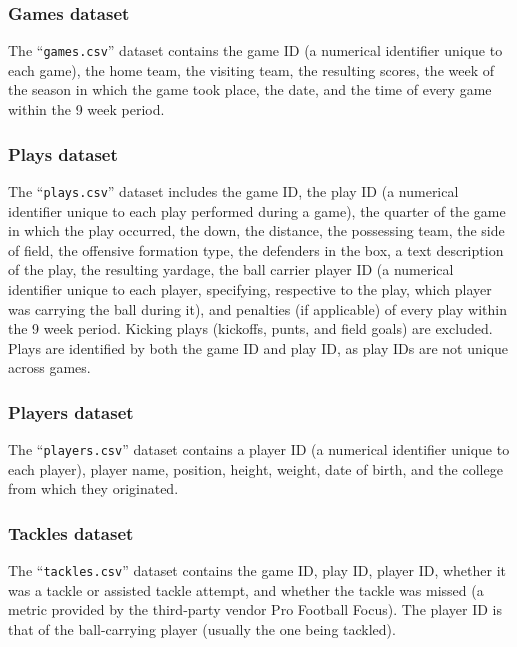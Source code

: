 \documentclass[bibtex, sigconf, hyperref={colorlinks=true,linkcolor=blue,urlcolor=blue}]{acmart}
\begin{document}
\subsubsection{Games dataset}

The ``\verb|games.csv|'' dataset contains the game ID (a numerical identifier unique to each game),
the home team, the visiting team, the resulting scores, the week of the season in which the game took
place, the date, and the time of every game within the 9 week period.

\subsubsection{Plays dataset}

The ``\verb|plays.csv|'' dataset includes the game ID, the play ID (a numerical identifier unique to
each play performed during a game), the quarter of the game in which the play occurred,
the down, the distance, the possessing team, the side of field, the offensive formation type,
the defenders in the box, a text description of the play, the resulting yardage,
the ball carrier player ID (a numerical identifier unique to each player, specifying, respective to the
play, which player was carrying the ball during it), and penalties (if
applicable) of every play within the 9 week period. Kicking plays (kickoffs,
punts, and field goals) are excluded. Plays are identified by both the game ID
and play ID, as play IDs are not unique across games.

\subsubsection{Players dataset}

The ``\verb|players.csv|'' dataset contains a player ID (a numerical identifier unique to each player),
player name, position, height, weight, date of birth, and the college from which they originated.

\subsubsection{Tackles dataset}

The ``\verb|tackles.csv|'' dataset contains the game ID, play ID, player ID, whether it was a
tackle or assisted tackle attempt, and whether the tackle was missed (a metric
provided by the third-party vendor Pro Football Focus). The player ID is that of the
ball-carrying player (usually the one being tackled).
\end{document}
